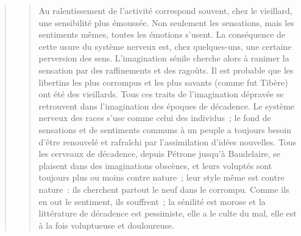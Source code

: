 \documentclass[french,twoside]{book} %
\begin{document}
\begin{verse}
\begin{verse}
Au ralentissement de l’activité correspond souvent, chez le vieillard, une sensibilité plus émoussée. Non seulement les sensations, mais les sentiments mêmes, toutes les émotions s’usent. La conséquence de cette usure du système nerveux est, chez quelques-uns, une certaine perversion des sens. L’imagination sénile cherche alors à ranimer la sensation par des raffinements et des ragoûts. Il est probable que les libertins les plus corrompus et les plus savants (comme fut Tibère) ont été des vieillards. Tous ces traits de l’imagination dépravée se retrouvent dans l’imagination des époques de décadence. Le système nerveux des races s’use comme celui des individus ; le fond de sensations et de sentiments communs à un peuple a toujours besoin d’être renouvelé et rafraîchi par l’assimilation d’idées nouvelles. Tous les cerveaux de décadence, depuis Pétrone jusqu’à Baudelaire, se plaisent dans des imaginations obscènes, et leurs voluptés sont toujours plus ou moins contre nature ; leur style même est contre nature : ils cherchent partout le neuf dans le corrompu. Comme ils en out le sentiment, ils souffrent ; la sénilité est morose et la littérature de décadence est pessimiste, elle a le culte du mal, elle est à la fois voluptueuse et douloureuse.\par

\end{verse}
\end{verse}
\end{document}
